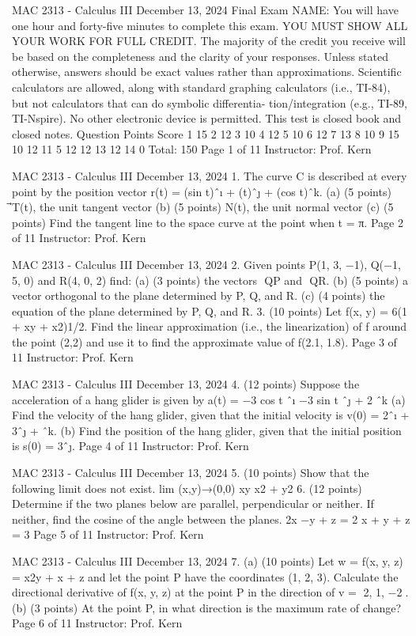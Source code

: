 MAC 2313 - Calculus III
December 13, 2024
Final Exam
NAME:
You will have one hour and forty-five minutes to complete this exam. YOU MUST SHOW
ALL YOUR WORK FOR FULL CREDIT. The majority of the credit you receive will be
based on the completeness and the clarity of your responses. Unless stated otherwise, answers
should be exact values rather than approximations. Scientific calculators are allowed, along with
standard graphing calculators (i.e., TI-84), but not calculators that can do symbolic differentia-
tion/integration (e.g., TI-89, TI-Nspire). No other electronic device is permitted. This test is closed
book and closed notes.
Question
Points
Score
1
15
2
12
3
10
4
12
5
10
6
12
7
13
8
10
9
15
10
12
11
5
12
12
13
12
14
0
Total:
150
Page 1 of 11
Instructor: Prof. Kern

MAC 2313 - Calculus III
December 13, 2024
1. The curve C is described at every point by the position vector ⃗r(t) = (sin t)ˆı + (t)ˆȷ + (cos t)ˆk.
(a)
(5 points)
⃗T(t), the unit tangent vector
(b)
(5 points)
⃗N(t), the unit normal vector
(c)
(5 points)
Find the tangent line to the space curve at the point when t = π.
Page 2 of 11
Instructor: Prof. Kern

MAC 2313 - Calculus III
December 13, 2024
2. Given points P(1, 3, −1), Q(−1, 5, 0) and R(4, 0, 2) find:
(a)
(3 points)
the vectors ⃗
QP and ⃗
QR.
(b)
(5 points)
a vector orthogonal to the plane determined by P, Q, and R.
(c)
(4 points)
the equation of the plane determined by P, Q, and R.
3.
(10 points)
Let f(x, y) = 6(1 + xy + x2)1/2. Find the linear approximation (i.e., the linearization) of f
around the point (2,2) and use it to find the approximate value of f(2.1, 1.8).
Page 3 of 11
Instructor: Prof. Kern

MAC 2313 - Calculus III
December 13, 2024
4.
(12 points)
Suppose the acceleration of a hang glider is given by
⃗a(t) = −3 cos t ˆı −3 sin t ˆȷ + 2 ˆk
(a) Find the velocity of the hang glider, given that the initial velocity is ⃗v(0) = 2ˆı + 3ˆȷ + ˆk.
(b) Find the position of the hang glider, given that the initial position is ⃗s(0) = 3ˆȷ.
Page 4 of 11
Instructor: Prof. Kern

MAC 2313 - Calculus III
December 13, 2024
5.
(10 points)
Show that the following limit does not exist.
lim
(x,y)→(0,0)
xy
x2 + y2
6.
(12 points)
Determine if the two planes below are parallel, perpendicular or neither. If neither, find the
cosine of the angle between the planes.
2x −y + z = 2
x + y + z = 3
Page 5 of 11
Instructor: Prof. Kern

MAC 2313 - Calculus III
December 13, 2024
7.
(a)
(10 points)
Let w = f(x, y, z) = x2y + x
 + z and let the point P have the coordinates (1, 2,
3).
Calculate the directional derivative of f(x, y, z) at the point P in the direction of
⃗v = ⟨2, 1, −2⟩.
(b)
(3 points)
At the point P, in what direction is the maximum rate of change?
Page 6 of 11
Instructor: Prof. Kern

